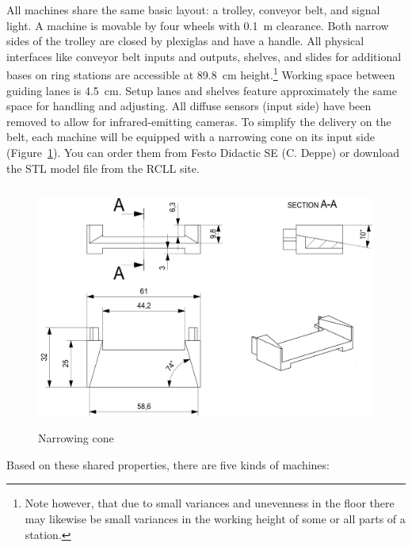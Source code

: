 \documentclass[12pt,twoside]{article}
\newcommand{\reffig}[1]{Figure~\ref{#1}}
\begin{document}
All machines share the same basic layout: a trolley, conveyor belt,
and signal light. A machine is movable by four wheels with
\SI{0.1}{\metre} clearance. Both narrow sides of the trolley are
closed by plexiglas and have a handle. All physical interfaces like
conveyor belt inputs and outputs, shelves, and slides for additional
bases on ring stations are accessible at \SI{89.8}{\centi\metre}
height.\footnote{Note however, that due to small variances and
  unevenness in the floor there may likewise be small variances in the
  working height of some or all parts of a station.} Working space
between guiding lanes is \SI{4.5}{\centi\metre}. Setup lanes and
shelves feature approximately the same space for handling and
adjusting. All diffuse sensors (input side) have been removed to allow
for infrared-emitting cameras.  To simplify the delivery on the belt,
each machine will be equipped with a narrowing cone on its input side
(\reffig{fig:narrow-cone}).  You can order them from Festo Didactic SE
(C. Deppe) or download the STL model file from the RCLL site.
\begin{figure}
    \includegraphics[height=8cm]{narrowConeSketch.jpg}
\caption{Narrowing cone}
\label{fig:narrow-cone}
\end{figure}
%
Based on these shared properties, there are five kinds of machines:
\end{document}
